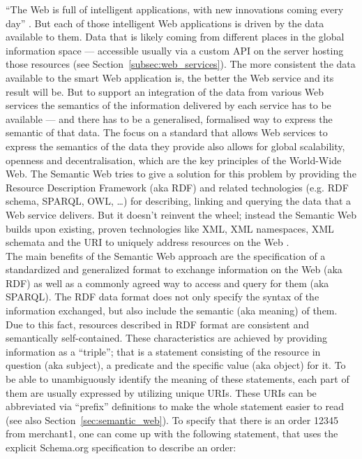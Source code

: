 ``The Web is full of intelligent applications, with new innovations coming every day'' \citep{allemang2011semantic}. But each of those intelligent Web applications is driven by the data available to them. Data that is likely coming from different places in the global information space — accessible usually via a custom API on the server hosting those resources (see Section~\ref{subsec:web_services}). The more consistent the data available to the smart Web application is, the better the Web service and its result will be. But to support an integration of the data from various Web services the semantics of the information delivered by each service has to be available — and there has to be a generalised, formalised way to express the semantic of that data. The focus on a standard that allows Web services to express the semantics of the data they provide also allows for global scalability, openness and decentralisation, which are the key principles of the World-Wide Web. The Semantic Web tries to give a solution for this problem by providing the Resource Description Framework (aka \gls{RDF}) and related technologies (e.g. RDF schema, \gls{SPARQL}, \gls{OWL}, \ldots) for describing, linking and querying the data that a Web service delivers. But it doesn’t reinvent the wheel; instead the Semantic Web builds upon existing, proven technologies like \gls{XML}, XML namespaces, XML schemata and the \gls{URI} to uniquely address resources on the Web \citep{allemang2011semantic}. \\

The main benefits of the Semantic Web approach are the specification of a standardized and generalized format to exchange information on the Web (aka \gls{RDF}) as well as a commonly agreed way to access and query for them (aka \gls{SPARQL}). The \gls{RDF} data format does not only specify the syntax of the information exchanged, but also include the semantic (aka meaning) of them. Due to this fact, resources described in \gls{RDF} format are consistent and semantically self-contained. These characteristics are achieved by providing information as a ``triple''; that is a statement consisting of the resource in question (aka subject), a predicate and the specific value (aka object) for it. To be able to unambiguously identify the meaning of these statements, each part of them are usually expressed by utilizing unique \gls{URI}s. These \gls{URI}s can be abbreviated via ``prefix'' definitions to make the whole statement easier to read (see also Section~\ref{sec:semantic_web}). To specify that there is an order 12345 from merchant1, one can come up with the following statement, that uses the explicit Schema.org specification \citep{Schema.org} to describe an order: \@

